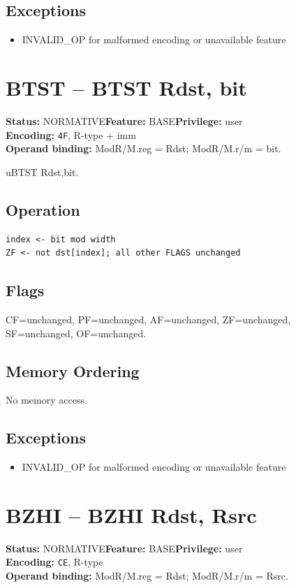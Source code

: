 \documentclass[10pt]{article}
\begin{document}
\subsection*{Exceptions}
\begin{itemize}
\item INVALID\_OP for malformed encoding or unavailable feature
\end{itemize}
\clearpage

\section{BTST -- BTST Rdst, bit}
\textbf{Status:} NORMATIVE\quad \textbf{Feature:} BASE\quad \textbf{Privilege:} user\\
\textbf{Encoding:} \texttt{4F}, R-type + imm\\
\textbf{Operand binding:} ModR/M.reg = Rdst; ModR/M.r/m = bit.

uBTST Rdst,bit.

\subsection*{Operation}
\begin{lstlisting}
index <- bit mod width
ZF <- not dst[index]; all other FLAGS unchanged
\end{lstlisting}
\subsection*{Flags}
CF=unchanged, PF=unchanged, AF=unchanged, ZF=unchanged, SF=unchanged, OF=unchanged.
\subsection*{Memory Ordering}
No memory access.
\subsection*{Exceptions}
\begin{itemize}
\item INVALID\_OP for malformed encoding or unavailable feature
\end{itemize}
\clearpage

\section{BZHI -- BZHI Rdst, Rsrc}
\textbf{Status:} NORMATIVE\quad \textbf{Feature:} BASE\quad \textbf{Privilege:} user\\
\textbf{Encoding:} \texttt{CE}, R-type\\
\textbf{Operand binding:} ModR/M.reg = Rdst; ModR/M.r/m = Rsrc.
\end{document}
